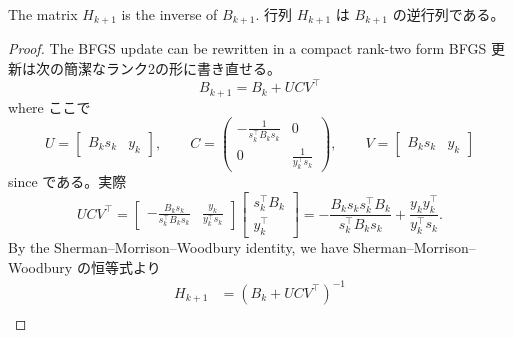 \documentclass[0_main]{subfiles}
\begin{document}
\begin{proposition}
    \ifEn
        The matrix $H_{k+1}$ is the inverse of $B_{k+1}$.
    \else
        行列 $H_{k+1}$ は $B_{k+1}$ の逆行列である。
    \fi
\end{proposition}
\begin{proof}
    \ifEn
        The BFGS update can be rewritten in a compact rank-two form
    \else
        BFGS 更新は次の簡潔なランク2の形に書き直せる。
    \fi
    \begin{equation*}
        B_{k+1} = B_k + UCV^\top
    \end{equation*}
    \ifEn
        where
    \else
        ここで
    \fi
    \begin{equation*}
        U = \begin{bmatrix}B_k s_k & y_k\end{bmatrix},\qquad
        C = \begin{pmatrix}-\frac{1}{s_k^\top B_k s_k} & 0 \\ 0 & \frac{1}{y_k^\top s_k}\end{pmatrix},\qquad
        V = \begin{bmatrix}B_k s_k & y_k\end{bmatrix}
    \end{equation*}
    \ifEn
        since
    \else
        である。実際
    \fi
    \begin{equation*}
        U C V^\top   = \begin{bmatrix} -\frac{B_k s_k}{s_k^\top B_k s_k}&    \frac{y_k}{y_k^\top s_k} \end{bmatrix} \begin{bmatrix} s_k^\top B_k  \\  y_k^\top \end{bmatrix}
        = -\frac{B_k s_k s_k^\top B_k}{s_k^\top B_k s_k} + \frac{y_k y_k^\top}{y_k^\top s_k}.
    \end{equation*}
    \ifEn
        By the Sherman--Morrison--Woodbury identity, we have
    \else
        Sherman--Morrison--Woodbury の恒等式より
    \fi
    \begin{align*}
        H_{k+1} & = (B_k + U C V^\top)^{-1}                                                                                                                                                                                                                                                                                                                                                                                                                                                                                                                                                                                                                                                                      \\

\end{align*}
\end{proof}
\end{document}
